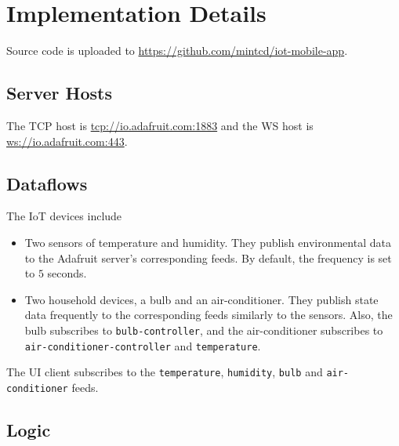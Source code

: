 \section{Implementation Details}
Source code is uploaded to \url{https://github.com/mintcd/iot-mobile-app}.

\subsection{Server Hosts}
The TCP host is \url{tcp://io.adafruit.com:1883} and the WS host is \url{ws://io.adafruit.com:443}.

\subsection{Dataflows}

The IoT devices include

\begin{itemize}
  \item Two sensors of temperature and humidity. They publish environmental data to the Adafruit server's corresponding feeds. By default, the frequency is set to $5$ seconds.
  \item Two household devices, a bulb and an air-conditioner. They publish state data frequently to the corresponding feeds similarly to the sensors. Also, the bulb subscribes to \texttt{bulb-controller}, and the air-conditioner subscribes to \texttt{air-conditioner-controller} and \texttt{temperature}.
\end{itemize}

The UI client subscribes to the \texttt{temperature}, \texttt{humidity}, \texttt{bulb} and \texttt{air-conditioner} feeds.

\subsection{Logic}

